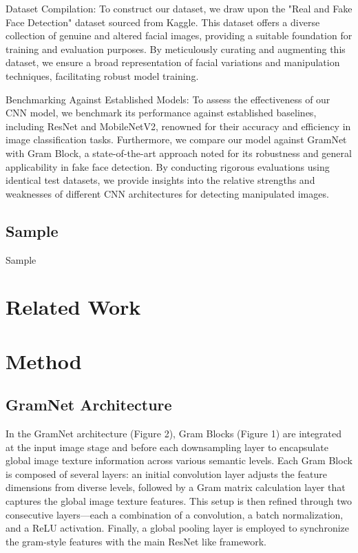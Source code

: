 \documentclass[rebuttal]{cvpr}
\begin{document}
Dataset Compilation:
To construct our dataset, we draw upon the "Real and Fake Face Detection" dataset sourced from Kaggle. This dataset offers a diverse collection of genuine and altered facial images, providing a suitable foundation for training and evaluation purposes. By meticulously curating and augmenting this dataset, we ensure a broad representation of facial variations and manipulation techniques, facilitating robust model training.
 
Benchmarking Against Established Models:
To assess the effectiveness of our CNN model, we benchmark its performance against established baselines, including ResNet and MobileNetV2, renowned for their accuracy and efficiency in image classification tasks. Furthermore, we compare our model against GramNet with Gram Block, a state-of-the-art approach noted for its robustness and general applicability in fake face detection. By conducting rigorous evaluations using identical test datasets, we provide insights into the relative strengths and weaknesses of different CNN architectures for detecting manipulated images.


\subsection{Sample}
Sample

\section{Related Work}
\section{Method}

\subsection{GramNet Architecture}
In the GramNet architecture (Figure 2), Gram Blocks (Figure 1) are integrated at the input image stage and before each downsampling layer to encapsulate global image texture information across various semantic levels. Each Gram Block is composed of several layers: an initial convolution layer adjusts the feature dimensions from diverse levels, followed by a Gram matrix calculation layer that captures the global image texture features. This setup is then refined through two consecutive layers—each a combination of a convolution, a batch normalization, and a ReLU activation. Finally, a global pooling layer is employed to synchronize the gram-style features with the main ResNet like framework.
\end{document}
